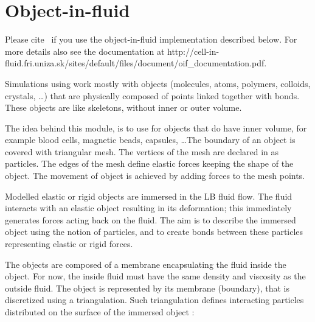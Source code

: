 %  
%   
%  
%  
%

\chapter{Object-in-fluid}
\label{sec:oif}

\begin{citebox}
  Please cite~ if you use the object-in-fluid implementation described below. For more details also see the documentation at http://cell-in-fluid.fri.uniza.sk/sites/default/files/document/oif_documentation.pdf.
\end{citebox}

Simulations using \es work mostly with objects (molecules, atoms, polymers, colloids, crystals, \dots) that are physically composed of points linked together with bonds. These objects are like skeletons, without inner or outer volume. 

The idea behind this module, is to use \es for objects that do have inner volume, for example blood cells, magnetic beads, capsules, \dots The boundary of an object is covered with triangular mesh. The vertices of the mesh are declared in \es as particles. The edges of the mesh define elastic forces keeping the shape of the object. The movement of object is achieved by adding forces to the mesh points.

Modelled elastic or rigid objects are immersed in the LB fluid flow. The fluid interacts with an elastic object resulting in its deformation; this immediately generates forces acting back on the fluid. The aim is to describe the immersed object using the notion of particles, and to create bonds between these particles representing elastic or rigid forces.

The objects are composed of a membrane encapsulating the fluid inside the object. For now, the inside fluid must have the same density and viscosity as the outside fluid. The object is represented by its membrane (boundary), that is discretized using a triangulation. Such triangulation defines interacting particles distributed on the surface of the immersed object \cite{dupin07}:

